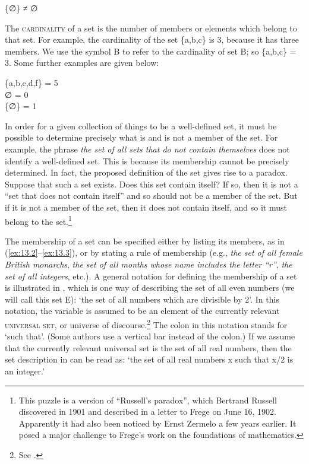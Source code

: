 \ea \label{ex:13.4}
  \{∅\} ≠ ∅
\z


The \textsc{cardinality} of a set is the number of members or elements which belong to that set. For example, the cardinality of the set \{a,b,c\} is 3, because it has three members. We use the symbol {\textbar}B{\textbar} to refer to the cardinality of set B; so {\textbar}\{a,b,c\}{\textbar} = 3. Some further examples are given below:


\ea \label{ex:13.5}
{\textbar}\{a,b,c,d,f\}{\textbar} = 5\\
{\textbar}∅{\textbar} = 0\\
{\textbar}\{∅\}{\textbar} = 1
\z


In order for a given collection of things to be a well-defined set, it must be possible to determine precisely what is and is not a member of the set. For example, the phrase \textit{the set of all sets that do not contain themselves} does not identify a well-defined set. This is because its membership cannot be precisely determined. In fact, the proposed definition of the set gives rise to a paradox. Suppose that such a set exists. Does this set contain itself? If so, then it is not a “set that does not contain itself” and so should not be a member of the set. But if it is not a member of the set, then it does not contain itself, and so it must belong to the set.\footnote{This puzzle is a version of “Russell’s paradox”, which Bertrand Russell discovered in 1901 and described in a letter to Frege on June 16, 1902. Apparently it had also been noticed by Ernst Zermelo a few years earlier. It posed a major challenge to Frege’s work on the foundations of mathematics.}



The membership of a set can be specified either by listing its members, as in (\ref{ex:13.2}--\ref{ex:13.3}), or by stating a rule of membership (e.g., \textit{the set of all female British monarchs}, \textit{the set of all months whose name includes the letter “r”}, \textit{the set of all integers}, etc.). A general notation for defining the membership of a set is illustrated in , which is one way of describing the set of all even numbers (we will call this set E): ‘the set of all numbers which are divisible by 2’. In this notation, the variable is assumed to be an element of the currently relevant \textsc{universal set}, or universe of discourse.\footnote{See .} The colon in this notation stands for ‘such that’. (Some authors use a vertical bar {\textbar} instead of the colon.) If we assume that the currently relevant universal set is the set of all real numbers, then the set description in  can be read as: ‘the set of all real numbers x such that x/2 is an integer.’


